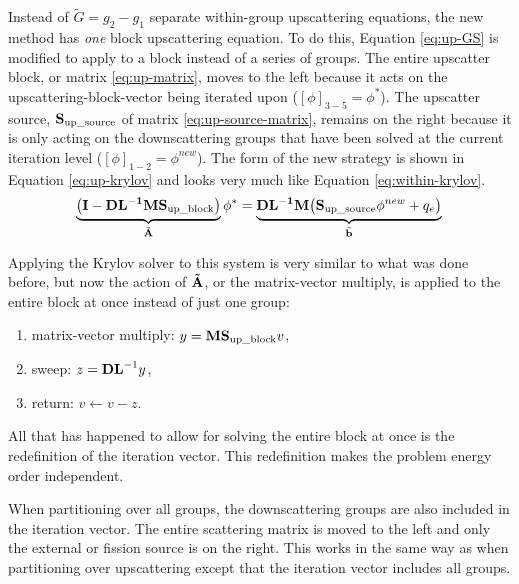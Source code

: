 Instead of $\tilde{G} = g_{2 }- g_{1}$ separate within-group upscattering equations, the new method has \emph{one} block upscattering equation. To do this, Equation \eqref{eq:up-GS} is modified to apply to a block instead of a series of groups. The entire upscatter block, or matrix \eqref{eq:up-matrix}, moves to the left because it acts on the upscattering-block-vector being iterated upon ($[\phi]_{3-5} = \phi^{*}$). The upscatter source, $\mathbf{S}_{\text{up\_source}}$ of matrix \eqref{eq:up-source-matrix}, remains on the right because it is only acting on the downscattering groups that have been solved at the current iteration level ($[\phi]_{1-2} = \phi^{new}$). The form of the new strategy is shown in Equation \eqref{eq:up-krylov} and looks very much like Equation \eqref{eq:within-krylov}.
%
\begin{equation}
 \underbrace{ \bigl( \mathbf{I} - \mathbf{DL^{-1}}\mathbf{M}\mathbf{S}_{\text{up\_block}} \bigr)}_{\tilde{\mathbf{A}}} \phi^{*} = \underbrace{ \mathbf{DL^{-1}}\mathbf{M} \bigl( \mathbf{S}_{\text{up\_source}}\phi^{new} + q_{e} \bigr)}_{\tilde{\mathbf{b}}}  \label{eq:up-krylov} \\
\end{equation}

Applying the Krylov solver to this system is very similar to what was done before, but now the action of $\mathbf{\tilde{A}}$, or the matrix-vector multiply, is applied to the entire block at once instead of just one group:
%
\begin{enumerate}
  \item matrix-vector multiply: $y = \mathbf{M}\mathbf{S}_{\text{up\_block}} v$,
  \item sweep: $z = \mathbf{DL}^{-1} y$,
  \item return: $v \leftarrow v - z$.
\end{enumerate}
%
All that has happened to allow for solving the entire block at once is the redefinition of the iteration vector. This redefinition makes the problem energy order independent. 

When partitioning over all groups, the downscattering groups are also included in the iteration vector. The entire scattering matrix is moved to the left and only the external or fission source is on the right. This works in the same way as when partitioning over upscattering except that the iteration vector includes all groups.

